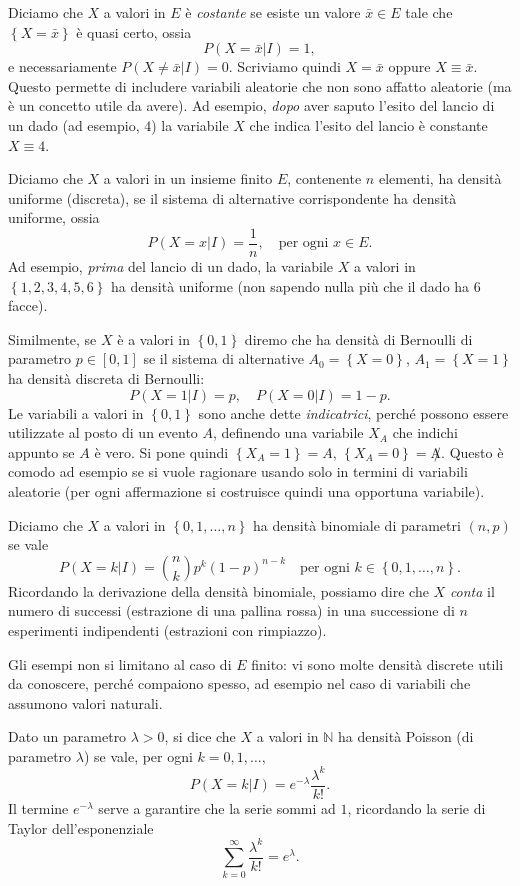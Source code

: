 \documentclass[
  italian,
  letterpaper,
]{book}
\newcommand{\cur}[1]{\left\{ #1 \right\}}
\theoremstyle{definition}
\theoremstyle{remark}
\begin{document}
Diciamo che \(X\) a valori in \(E\) è \emph{costante} se esiste un
valore \(\bar{x} \in E\) tale che \(\cur{X=\bar{x}}\) è quasi certo,
ossia \[ P(X = \bar{x}|I) = 1,\] e necessariamente
\(P(X \neq \bar{x} |I ) = 0\). Scriviamo quindi \(X = \bar{x}\) oppure
\(X \equiv \bar{x}\). Questo permette di includere variabili aleatorie
che non sono affatto aleatorie (ma è un concetto utile da avere). Ad
esempio, \emph{dopo} aver saputo l'esito del lancio di un dado (ad
esempio, \(4\)) la variabile \(X\) che indica l'esito del lancio è
constante \(X \equiv 4\).

Diciamo che \(X\) a valori in un insieme finito \(E\), contenente \(n\)
elementi, ha densità uniforme (discreta), se il sistema di alternative
corrispondente ha densità uniforme, ossia
\[ P(X = x | I) = \frac{1}{n}, \quad \text{per ogni $x \in E$.}\] Ad
esempio, \emph{prima} del lancio di un dado, la variabile \(X\) a valori
in \(\cur{1,2,3,4,5,6}\) ha densità uniforme (non sapendo nulla più che
il dado ha \(6\) facce).

Similmente, se \(X\) è a valori in \(\cur{0,1}\) diremo che ha densità
di Bernoulli di parametro \(p \in [0,1]\) se il sistema di alternative
\(A_0 = \cur{X = 0}\), \(A_1 =\cur{X=1}\) ha densità discreta di
Bernoulli: \[ P(X = 1 | I ) = p, \quad P(X=0| I) = 1-p.\] Le variabili a
valori in \(\cur{0,1}\) sono anche dette \emph{indicatrici}, perché
possono essere utilizzate al posto di un evento \(A\), definendo una
variabile \(X_A\) che indichi appunto se \(A\) è vero. Si pone quindi
\(\cur{X_A =1} = A\), \(\cur{X_A = 0} = \not A\). Questo è comodo ad
esempio se si vuole ragionare usando solo in termini di variabili
aleatorie (per ogni affermazione si costruisce quindi una opportuna
variabile).

Diciamo che \(X\) a valori in \(\cur{0,1, \ldots, n}\) ha densità
binomiale di parametri \((n,p)\) se vale
\[ P(X = k | I) = {n \choose k} p^k (1-p)^{n-k} \quad \text{per ogni $k \in \cur{0,1, \ldots, n}$.}\]
Ricordando la derivazione della densità binomiale, possiamo dire che
\(X\) \emph{conta} il numero di successi (estrazione di una pallina
rossa) in una successione di \(n\) esperimenti indipendenti (estrazioni
con rimpiazzo).

Gli esempi non si limitano al caso di \(E\) finito: vi sono molte
densità discrete utili da conoscere, perché compaiono spesso, ad esempio
nel caso di variabili che assumono valori naturali.

\protect{}\label{poisson-density}
Dato un parametro \(\lambda>0\), si dice che \(X\) a valori in
\(\mathbb{N}\) ha densità Poisson (di parametro \(\lambda\)) se vale,
per ogni \(k = 0, 1, \ldots\),
\[ P(X = k | I) = e^{-\lambda} \frac{\lambda^k}{k!}.\] Il termine
\(e^{-\lambda}\) serve a garantire che la serie sommi ad \(1\),
ricordando la serie di Taylor dell'esponenziale
\[ \sum_{k=0}^\infty \frac{ \lambda^k}{k!} = e^\lambda.\]
\end{document}
